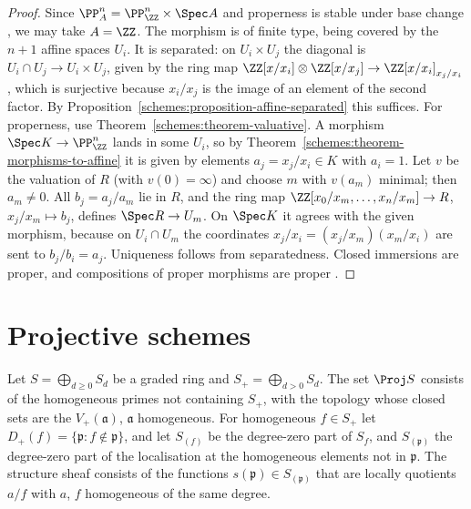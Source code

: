 \begin{proof}
Since $\PP^n_A = \PP^n_\ZZ \times \Spec A$ and properness is stable under base change \cite[Corollary II.4.8]{hartshorne-ag}, we may take $A = \ZZ$. The
morphism is of finite type, being covered by the $n + 1$ affine spaces $U_i$. It is separated: on $U_i \times U_j$ the diagonal is
$U_i \cap U_j \to U_i \times U_j$, given by the ring map $\ZZ[x/x_i] \otimes \ZZ[x/x_j] \to \ZZ[x/x_i]_{x_j/x_i}$, which is surjective because $x_i/x_j$ is the
image of an element of the second factor. By Proposition~\ref{schemes:proposition-affine-separated} this suffices. For properness, use
Theorem~\ref{schemes:theorem-valuative}. A morphism $\Spec K \to \PP^n_\ZZ$ lands in some $U_i$, so by
Theorem~\ref{schemes:theorem-morphisms-to-affine} it is given by elements $a_j = x_j/x_i \in K$ with $a_i = 1$. Let $v$ be the valuation of $R$
(with $v(0) = \infty$) and choose $m$ with $v(a_m)$ minimal; then $a_m \neq 0$. All $b_j = a_j/a_m$ lie in $R$, and the ring map
$\ZZ[x_0/x_m, \ldots, x_n/x_m] \to R$, $x_j/x_m \mapsto b_j$, defines $\Spec R \to U_m$. On $\Spec K$ it agrees with the given morphism, because on
$U_i \cap U_m$ the coordinates $x_j/x_i = (x_j/x_m)(x_m/x_i)$ are sent to $b_j/b_i = a_j$. Uniqueness follows from separatedness. Closed immersions are proper, and compositions of proper morphisms are proper \cite[Corollary II.4.8]{hartshorne-ag}.
\end{proof}

\section{Projective schemes}\label{schemes:section-proj}

\begin{definition}\label{schemes:definition-proj}
Let $S = \bigoplus_{d \geq 0}S_d$ be a graded ring and $S_+ = \bigoplus_{d > 0}S_d$. The set $\Proj S$ consists of the homogeneous primes not containing
$S_+$, with the topology whose closed sets are the $V_+(\mathfrak{a})$, $\mathfrak{a}$ homogeneous. For homogeneous $f \in S_+$ let
$D_+(f) = \{\mathfrak{p} : f \notin \mathfrak{p}\}$, and let $S_{(f)}$ be the degree-zero part of $S_f$, and $S_{(\mathfrak{p})}$ the degree-zero part of the
localisation at the homogeneous elements not in $\mathfrak{p}$. The structure sheaf consists of the functions $s(\mathfrak{p}) \in S_{(\mathfrak{p})}$ that are
locally quotients $a/f$ with $a$, $f$ homogeneous of the same degree.
\end{definition}

